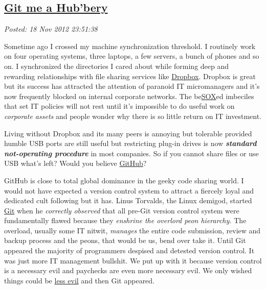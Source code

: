 %

\subsection*{\href{https://bakerjd99.wordpress.com/2012/11/18/git-me-a-hubbery/}{Git me a Hub'bery}}


\noindent\emph{Posted: 18 Nov 2012 23:51:38}
\vspace{6pt}

Sometime ago I crossed my machine synchronization threshold. I routinely
work on four operating systems, three laptops, a few servers, a bunch of
phones and so on. I synchronized the directories I cared about while
forming deep and rewarding relationships with file sharing services like
\href{https://www.dropbox.com/}{Dropbox}. Dropbox is great but its
success has attracted the attention of paranoid IT micromanagers and
it's now frequently blocked on internal corporate networks. The
be\href{http://www.techdirt.com/articles/20070115/163130.shtml}{SOX}ed
imbeciles that set IT policies will not rest until it's impossible to do
useful work on \emph{corporate assets} and people wonder why there is so
little return on IT investment.

Living without Dropbox and its many peers is annoying but tolerable
provided humble USB ports are still useful but restricting plug-in
drives is now \textbf{\emph{standard not-operating procedure}} in
most companies. So if you cannot share files or use USB what's left?
Would you believe \href{https://github.com/}{GitHub}?

GitHub is close to total global dominance in the geeky code sharing
world. I would not have expected a version control system
to attract a fiercely loyal and dedicated cult following but it has.
Linus Torvalds, the Linux demigod, started
\href{http://git-scm.com/}{Git} when he \emph{correctly observed} that
all pre-Git version control system were fundamentally flawed because
they \emph{enshrine the overlord peon hierarchy.} The overload, usually
some IT nitwit, \emph{manages} the entire code submission, review and
backup process and the peons, that would be us, bend over take it. Until
Git appeared the majority of programmers despised and detested version
control. It was just more IT management bullshit. We put up with it
because version control is a necessary evil and paychecks are even more
necessary evil. We only wished things could be
\href{http://www.youtube.com/watch?v=w27meg0YfEU}{less evil} and then
Git appeared.

